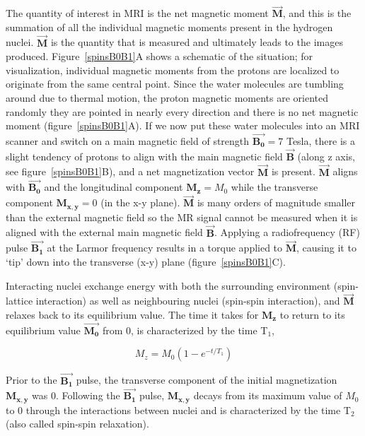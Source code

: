 The quantity of interest in MRI is the net magnetic moment  $\vec{\mathbf{M}}$, and this is the summation of all the individual magnetic moments present in the hydrogen nuclei. 
$\vec{\mathbf{M}}$ is the quantity that is measured and ultimately leads to the images produced.
Figure~\ref{spinsB0B1}A shows a schematic of the situation; for visualization, individual magnetic moments from the protons are localized to originate from the same central point.
Since the water molecules are tumbling around due to thermal motion, the proton magnetic moments are oriented randomly they are pointed in nearly every direction and there is no net magnetic moment (figure~\ref{spinsB0B1}A).
If we now put these water molecules into an MRI scanner and switch on a main magnetic field of strength $\vec{\mathbf{B_0}} = 7$ Tesla, there is a slight tendency of protons to align with the main magnetic field $\vec{\mathbf{B}}$ (along z axis, see figure~\ref{spinsB0B1}B), and a net magnetization vector $\vec{\mathbf{M}}$ is present.
$\vec{\mathbf{M}}$ aligns with $\vec{\mathbf{B_0}}$ and the longitudinal component $\mathbf{M_z} = M_0$ while the transverse component $\mathbf{M_{x,y}} = 0$ (in the x-y plane).
$\vec{\mathbf{M}}$ is many orders of magnitude smaller than the external magnetic field so the MR signal cannot be measured when it is aligned with the external main magnetic field $\vec{\mathbf{B}}$. 
Applying a radiofrequency (RF) pulse $\vec{\mathbf{B_1}}$ at the Larmor frequency results in a torque applied to $\vec{\mathbf{M}}$, causing it to `tip' down into the transverse (x-y) plane (figure~\ref{spinsB0B1}C).

Interacting nuclei exchange energy with both the surrounding environment (spin-lattice interaction) as well as neighbouring nuclei (spin-spin interaction), and $\vec{\mathbf{M}}$ relaxes back to its equilibrium value. 
The time it takes for $\mathbf{M_z}$ to return to its equilibrium value $\vec{\mathbf{M_0}}$ from 0, is characterized by the time T$_1$,

\begin{equation}
	M_z = M_0(1-e^{-t/T_1})
	\label{T1}
\end{equation}

Prior to the $\vec{\mathbf{B_1}}$ pulse, the transverse component of the initial magnetization $\mathbf{M_{x,y}}$ was 0.
Following the $\vec{\mathbf{B_1}}$ pulse, $\mathbf{M_{x,y}}$ decays from its maximum value of $M_0$ to 0 through the interactions between nuclei and is characterized by the time T$_2$ (also called spin-spin relaxation).
		
